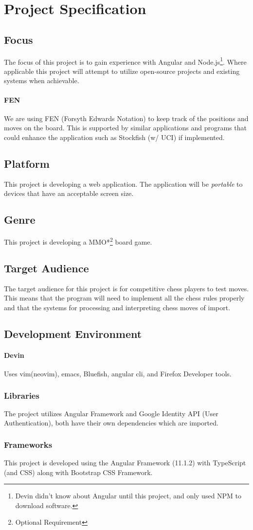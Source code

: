 \section{Project Specification}
\subsection{Focus}
The focus of this project is to gain experience with Angular and Node.js\footnote{Devin didn't know about Angular until this project, and only used NPM to download software.}. Where applicable this project will attempt to utilize open-source projects and existing systems when achievable. 
\paragraph{FEN} We are using FEN (Forsyth Edwards Notation) to keep track of the positions and moves on the board. This is supported by similar applications and programs that could enhance the application such as Stockfish (w/ UCI) if implemented.
\subsection{Platform}
This project is developing a web application. The application will be \emph{portable} to devices that have an acceptable screen size.
\subsection{Genre}
This project is developing a MMO*\footnote{Optional Requirement} board game.
\subsection{Target Audience}
The target audience for this project is for competitive chess players to test moves. This means that the program will need to implement all the chess rules properly and that the systems for processing and interpreting chess moves of import.
\subsection{Development Environment}
\paragraph{Devin} Uses vim(neovim), emacs, Bluefish, angular cli, and Firefox Developer tools.
\subsubsection{Libraries}
The project utilizes Angular Framework and Google Identity API (User Authentication), both have their own dependencies which are imported.
\subsubsection{Frameworks}
This project is developed using the Angular Framework (11.1.2) with TypeScript (and CSS) along with Bootstrap CSS Framework.

